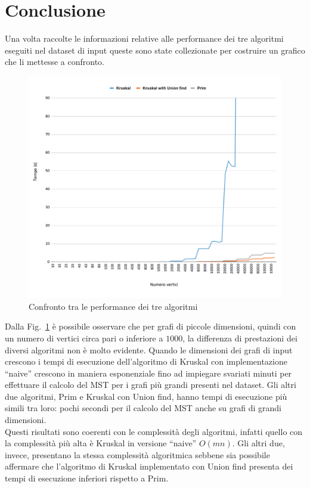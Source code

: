 \section{Conclusione}

Una volta raccolte le informazioni relative alle performance dei tre algoritmi eseguiti nel dataset di input queste sono state collezionate per costruire un grafico che li mettesse a confronto.

\begin{figure}[H]
	\hspace{-1cm}\includegraphics[width=19cm]{Img/compare.png}
	\caption{Confronto tra le performance dei tre algoritmi}
	\label{comparison}
\end{figure}

Dalla Fig.~\ref{comparison} è possibile osservare che per grafi di piccole dimensioni, quindi con un numero di vertici circa pari o inferiore a $1000$, la differenza di prestazioni dei diversi algoritmi non è molto evidente. 
Quando le dimensioni dei grafi di input crescono i tempi di esecuzione dell'algoritmo di Kruskal con implementazione ``naive'' crescono in maniera esponenziale fino ad impiegare svariati minuti per effettuare il calcolo del MST per i grafi più grandi presenti nel dataset. 
Gli altri due algoritmi, Prim e Kruskal con Union find, hanno tempi di esecuzione più simili tra loro: pochi secondi per il calcolo del MST anche su grafi di grandi dimensioni. \\
Questi risultati sono coerenti con le complessità degli algoritmi, infatti quello con la complessità più alta è Kruskal in versione ``naive'' $O(mn)$. Gli altri due, invece, presentano la stessa complessità algoritmica sebbene sia possibile affermare che l'algoritmo di Kruskal implementato con Union find presenta dei tempi di esecuzione inferiori rispetto a Prim.
\pagebreak